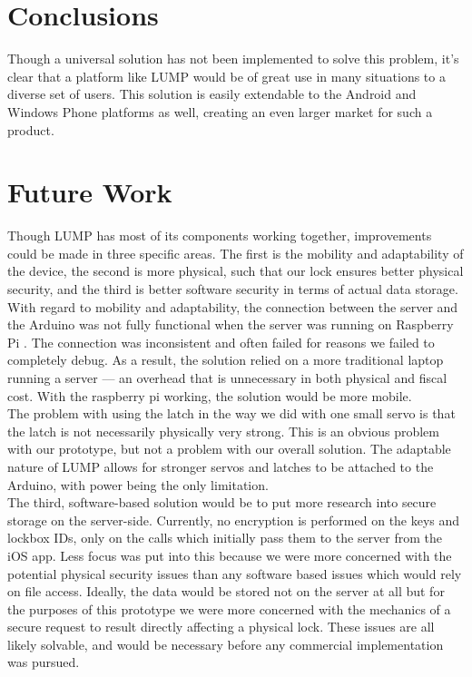 \documentclass[10pt]{article}
\begin{document}
\begin{multicols}{2}
\section{Conclusions}
Though a universal solution has not been implemented to solve this problem, it's clear that a platform like LUMP would be of great use in many situations to a diverse set of users. This solution is easily extendable to the Android and Windows Phone platforms as well, creating an even larger market for such a product. 

\section{Future Work}
Though LUMP has most of its components working together, improvements could be made in three specific areas. The first is the mobility and adaptability of the device, the second is more physical, such that our lock ensures better physical security, and the third is better software security in terms of actual data storage.\\

With regard to mobility and adaptability, the connection between the server and the Arduino was not fully functional when the server was running on Raspberry Pi \cite{breakfastserialissue}. The connection was inconsistent and often failed for reasons we failed to completely debug. As a result, the solution relied on a more traditional laptop running a server --- an overhead that is unnecessary in both physical and fiscal cost. With the raspberry pi working, the solution would be more mobile.\\

The problem with using the latch in the way we did with one small servo is that the latch is not necessarily physically very strong. This is an obvious problem with our prototype, but not a problem with our overall solution. The adaptable nature of LUMP allows for stronger servos and latches to be attached to the Arduino, with power being the only limitation.\\

The third, software-based solution would be to put more research into secure storage on the server-side. Currently, no encryption is performed on the keys and lockbox IDs, only on the calls which initially pass them to the server from the iOS app. Less focus was put into this because we were more concerned with the potential physical security issues than any software based issues which would rely on file access. Ideally, the data would be stored not on the server at all but for the purposes of this prototype we were more concerned with the mechanics of a secure request to result directly affecting a physical lock. These issues are all likely solvable, and would be necessary before any commercial implementation was pursued.\\


\end{multicols}
\end{document}
